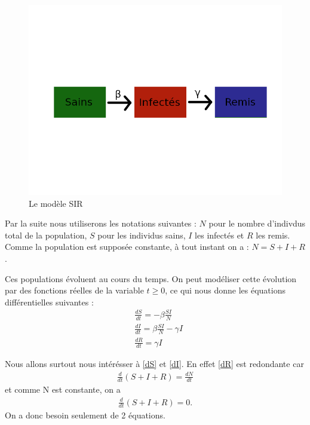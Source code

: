 \documentclass[a4paper]{article}
\theoremstyle{plain}
\theoremstyle{definition}
\theoremstyle{remark}
\begin{document}
\begin{figure}[!h]
\begin{center}
   \includegraphics[scale= 1.2]{SIR.png}
   \end{center}
     \caption{Le modèle SIR}
\end{figure}

Par la suite nous utiliserons les notations suivantes : $N$ pour le nombre d'indivdus total de la population, $S$ pour les individus sains, $I$ les infectés et $R$ les remis.
Comme la population est supposée constante, à tout instant on a : $ N = S + I + R$.

Ces populations évoluent au cours du temps.
On peut modéliser cette évolution par des fonctions réelles de la variable $t \geq 0$, ce qui nous donne les équations différentielles suivantes :
\begin{align}
\label{dS}
&\frac{dS}{dt} = -\beta\frac{SI}{N} \\
\label{dI}
&\frac{dI}{dt} = \beta\frac{SI}{N} - \gamma I \\
\label{dR}  
&\frac{dR}{dt} = \gamma I 
\end{align}

Nous allons surtout nous intérésser à \eqref{dS} et \eqref{dI}. En effet \eqref{dR} est redondante car
\begin{align*}
\frac{d}{dt} (S + I + R) = \frac{dN}{dt}
\end{align*} 
et comme N est constante, on a
\begin{align*}
\frac{d}{dt}(S + I +R) = 0 .
\end{align*}
On a donc besoin seulement de 2 équations.
\end{document}

